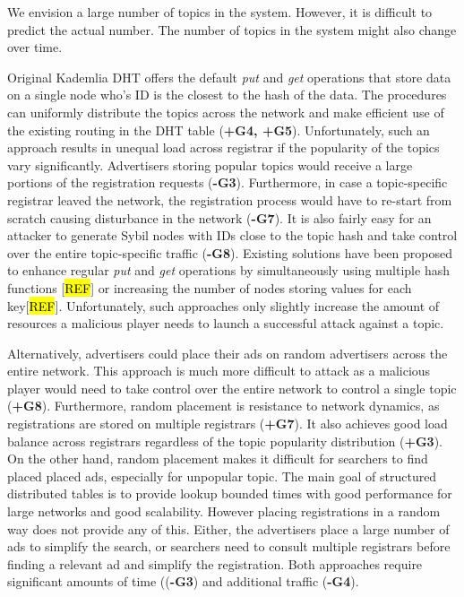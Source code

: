  We envision a large number of topics in the system. However, it is difficult to predict the actual number. The number of topics in the system might also change over time. 

Original Kademlia DHT offers the default \emph{put} and \emph{get} operations that store data on a single node who's ID is the closest to the hash of the data. 
The procedures can uniformly distribute the topics across the network and make efficient use of the existing routing in the DHT table (\textbf{+G4, +G5}). 
Unfortunately,  such an approach results in unequal load across registrar if the popularity of the topics vary significantly. 
Advertisers storing popular topics would receive a large portions of the registration requests (\textbf{-G3}). Furthermore,  in case a topic-specific registrar leaved the network,  the registration process would have to re-start from scratch causing disturbance in the network (\textbf{-G7}). 
It is also fairly easy for an attacker to generate Sybil nodes with IDs close to the topic hash and take control over the entire topic-specific traffic (\textbf{-G8}).
Existing solutions have been  proposed to enhance regular \emph{put} and \emph{get} operations by simultaneously using multiple hash functions [\hl{REF}] or increasing the number of nodes storing values for each key[\hl{REF}]. 
Unfortunately, such approaches only slightly increase the amount of resources a malicious player needs to launch a successful attack against a topic. 

Alternatively,  advertisers could place their ads on random advertisers across the entire network. 
This approach is much more difficult to attack as a malicious player would need to take control over the entire network to control a single topic (\textbf{+G8}). 
Furthermore, random placement is resistance to network dynamics, as registrations are stored on multiple registrars (\textbf{+G7}). 
It also achieves good load balance across registrars regardless of the topic popularity distribution (\textbf{+G3}). 
On the other hand,  random placement makes it difficult for searchers to find placed placed ads, especially for unpopular topic. 
The main goal of structured distributed tables is to provide lookup bounded times with good performance for large networks and good scalability.
However placing registrations in a random way does not provide any of this.
Either, the advertisers place a large number of ads to simplify the search, or searchers need to consult multiple registrars before finding a relevant ad and simplify the registration. 
Both approaches require significant amounts of time ((\textbf{-G3}) and additional traffic (\textbf{-G4}). 

